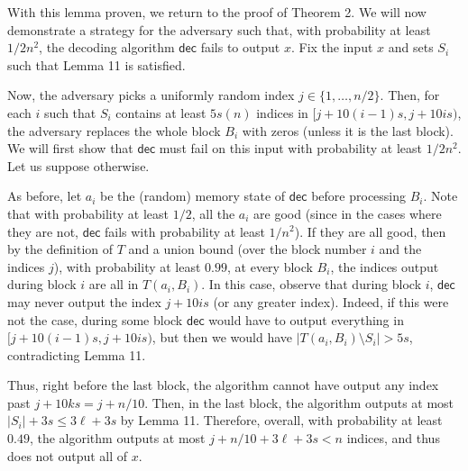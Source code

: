 \documentclass[10pt,a4paper]{article}
\begin{document}
With this lemma proven, we return to the proof of Theorem 2. We will now demonstrate a strategy for the adversary such that, with probability at least $1/2n^{2}$, the decoding algorithm $\mathsf{dec}$ fails to output $x$. Fix the input $x$ and sets $S_{i}$ such that Lemma 11 is satisfied.\par




Now, the adversary picks a uniformly random index $j\in\{1,\dots,n/2\}$. Then, for each $i$ such that $S_{i}$ contains at least $5s(n)$ indices in $[j+10(i-1)s,j+10is)$, the adversary replaces the whole block $B_{i}$ with zeros (unless it is the last block). We will first show that $\mathsf{dec}$ must fail on this input with probability at least $1/2n^{2}$. Let us suppose otherwise.\par




As before, let $a_{i}$ be the (random) memory state of $\mathsf{dec}$ before processing $B_{i}$. Note that with probability at least $1/2$, all the $a_{i}$ are good (since in the cases where they are not, $\mathsf{dec}$ fails with probability at least $1/n^{2}$). If they are all good, then by the definition of $T$ and a union bound (over the block number $i$ and the indices $j$), with probability at least $0.99$, at every block $B_{i}$, the indices output during block $i$ are all in $T(a_{i},B_{i})$. In this case, observe that during block $i$, $\mathsf{dec}$ may never output the index $j+10is$ (or any greater index). Indeed, if this were not the case, during some block $\mathsf{dec}$ would have to output everything in $[j+10(i-1)s,j+10is)$, but then we would have $|T(a_{i},B_{i})\setminus S_{i}|>5s$, contradicting Lemma 11.\par




Thus, right before the last block, the algorithm cannot have output any index past $j+10ks=j+n/10$. Then, in the last block, the algorithm outputs at most $|S_{i}|+3s\leq 3\ell+3s$ by Lemma 11. Therefore, overall, with probability at least $0.49$, the algorithm outputs at most $j+n/10+3\ell+3s<n$ indices, and thus does not output all of $x$.\par
\end{document}
